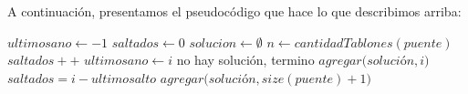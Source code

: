 \documentclass{article}
\begin{document}
A continuaci\'on, presentamos el pseudoc\'odigo que hace lo que describimos arriba:
\vspace{0.4cm}
\begin{algorithmic}[1]
	\State $ultimosano\gets -1$
	\State $saltados\gets 0$
	\State $solucion\gets \emptyset$
	\State $n\gets cantidadTablones(puente)$
		\State $saltados++$
			\State $ultimosano\gets i$
		\EndIf
				\State no hay soluci\'on, termino
			\EndIf
			\State $agregar(soluci$\'o$n, i)$
			\State $saltados = i - ultimosalto$
		\EndIf
	\EndFor
	\State $agregar(soluci$\'o$n, size(puente) + 1)$
\EndProcedure
\end{algorithmic}
\end{document}
